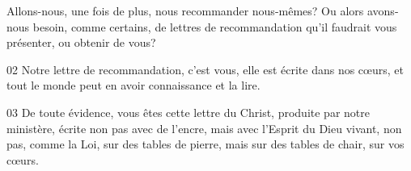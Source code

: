 Allons-nous, une fois de plus, nous recommander nous-mêmes? Ou alors avons-nous besoin, comme certains, de lettres de recommandation qu’il faudrait vous présenter, ou obtenir de vous?

02 Notre lettre de recommandation, c’est vous, elle est écrite dans nos cœurs, et tout le monde peut en avoir connaissance et la lire.

03 De toute évidence, vous êtes cette lettre du Christ, produite par notre ministère, écrite non pas avec de l’encre, mais avec l’Esprit du Dieu vivant, non pas, comme la Loi, sur des tables de pierre, mais sur des tables de chair, sur vos cœurs.
